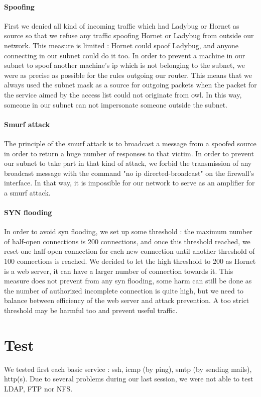 \documentclass[a4paper,titlepage]{article}
\begin{document}
\paragraph{Spoofing}
First we denied all kind of incoming traffic which had Ladybug or Hornet as source so that we refuse any traffic spoofing Hornet or Ladybug from outside our network. This measure is limited : Hornet could spoof Ladybug, and anyone connecting in our subnet could do it too. In order to  prevent a machine in our subnet to spoof another machine's ip which is not belonging to the subnet, we were as precise as possible for the rules outgoing our router. This means that we always used the subnet mask as a source for outgoing packets when the packet for the service aimed by the access list could not originate from owl.  In this way, someone in our subnet can not impersonate someone outside the subnet.
 
\paragraph{Smurf attack}
The principle of the smurf attack is to broadcast a message from a spoofed source in order to return a huge number of responses to that victim. 
In order to prevent our subnet to take part in that kind of attack, we forbid the transmission of any broadcast message with the command "no ip directed-broadcast" on the firewall's interface. In that way, it is impossible for our network to serve as an amplifier for a smurf attack.

\paragraph{SYN flooding}
In order to avoid syn flooding, we set up some threshold : the maximum number of half-open connections is 200 connections, and once this threshold reached, we reset one half-open connection for each new connection until another threshold of 100 connections is reached. We decided to let the high threshold to 200 as Hornet is a web server, it can have a larger number of connection towards it. This measure does not prevent from any syn flooding, some harm can still be done as the number of authorized incomplete connection is quite high, but we need to balance between efficiency of the web server and attack prevention. A too strict threshold may be harmful too and prevent useful traffic.    

\section{Test}
We tested first each basic service : ssh, icmp (by ping), smtp (by sending mails), http(s). Due to several problems during our last session, we were not able to test LDAP, FTP nor NFS. 
\end{document}
